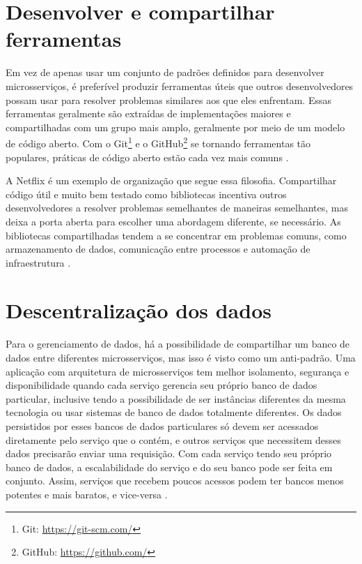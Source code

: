 \section{Desenvolver e compartilhar ferramentas}
Em vez de apenas usar um conjunto de padrões definidos para desenvolver microsserviços, é preferível produzir ferramentas úteis que outros desenvolvedores possam usar para resolver problemas similares aos que eles enfrentam. Essas ferramentas geralmente são extraídas de implementações maiores e compartilhadas com um grupo mais amplo, geralmente por meio de um modelo de código aberto. Com o Git\footnote{Git: \url{https://git-scm.com/}} e o GitHub\footnote{GitHub: \url{https://github.com/}} se tornando ferramentas tão populares, práticas de código aberto estão cada vez mais comuns \cite{martin-fowler-microservices}.

A Netflix é um exemplo de organização que segue essa filosofia. Compartilhar código útil e muito bem testado como bibliotecas incentiva outros desenvolvedores a resolver problemas semelhantes de maneiras semelhantes, mas deixa a porta aberta para escolher uma abordagem diferente, se necessário. As bibliotecas compartilhadas tendem a se concentrar em problemas comuns, como armazenamento de dados, comunicação entre processos e automação de infraestrutura \cite{martin-fowler-microservices}.

\section{Descentralização dos dados}

Para o gerenciamento de dados, há a possibilidade de compartilhar um banco de dados entre diferentes microsserviços, mas isso é visto como um anti-padrão. Uma aplicação com arquitetura de microsserviços tem melhor isolamento, segurança e disponibilidade quando cada serviço gerencia seu próprio banco de dados particular, inclusive tendo a possibilidade de ser instâncias diferentes da mesma tecnologia ou usar sistemas de banco de dados totalmente diferentes. Os dados persistidos por esses bancos de dados particulares só devem ser acessados diretamente pelo serviço que o contém, e outros serviços que necessitem desses dados precisarão enviar uma requisição. Com cada serviço tendo seu próprio banco de dados, a escalabilidade do serviço e do seu banco pode ser feita em conjunto. Assim, serviços que recebem poucos acessos podem ter bancos menos potentes e mais baratos, e vice-versa \cite{oracle_microservices,martin-fowler-microservices}.

